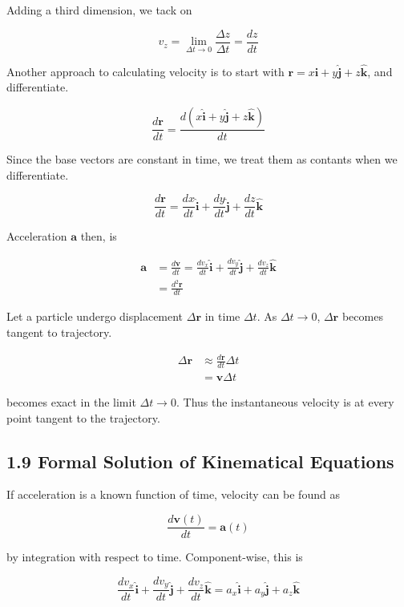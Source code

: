 \documentclass[12pt,twoside]{article}
\begin{document}
\begin{flushleft}
Adding a third dimension, we tack on

$$
  v_z = \lim_{\Delta t \rightarrow 0}\frac{\Delta z}{\Delta t} = \frac{dz}{dt}
$$


Another approach to calculating velocity is to start with $\mathbf{r} = x\mathbf{\hat{i}} + y\mathbf{\hat{j}} + z\mathbf{\hat{k}}$, and differentiate.

$$
\frac{d\mathbf{r}}{dt} = \frac{d(x\mathbf{\hat{i}} + y\mathbf{\hat{j}} + z\mathbf{\hat{k}})}{dt}
$$

Since the base vectors are constant in time, we treat them as contants when we differentiate.

$$
\frac{d\mathbf{r}}{dt} = \frac{dx}{dt}\mathbf{\hat{i}} + \frac{dy}{dt}\mathbf{\hat{j}} + \frac{dz}{dt}\mathbf{\hat{k}}
$$

Acceleration $\mathbf{a}$ then, is

\begin{align*}
  \mathbf{a} &= \frac{d\mathbf{v}}{dt} = \frac{dv_x}{dt}\mathbf{\hat{i}} + \frac{dv_y}{dt}\mathbf{\hat{j}} + \frac{dv_z}{dt}\mathbf{\hat{k}} \\
  &= \frac{d^2\mathbf{r}}{dt}
\end{align*}

Let a particle undergo displacement $\Delta \mathbf{r}$ in time $\Delta t$. As $\Delta t \rightarrow 0$, $\Delta \mathbf{r}$ becomes tangent to trajectory.

\begin{align*}
  \Delta \mathbf{r} &\approx \frac{d\mathbf{r}}{dt}\Delta t \\
                    &= \mathbf{v}\Delta t
\end{align*}

becomes exact in the limit $\Delta t \rightarrow 0$. Thus the instantaneous velocity is at every point tangent to the trajectory.

\subsection*{1.9 Formal Solution of Kinematical Equations}

If acceleration is a known function of time, velocity can be found as

$$
\frac{d\mathbf{v}(t)}{dt} = \mathbf{a}(t)
$$

by integration with respect to time. Component-wise, this is

$$
\frac{dv_x}{dt}\mathbf{\hat{i}} + \frac{dv_y}{dt}\mathbf{\hat{j}} + \frac{dv_z}{dt}\mathbf{\hat{k}} = a_x\mathbf{\hat{i}} + a_y\mathbf{\hat{j}} + a_z\mathbf{\hat{k}}
$$


\end{flushleft}
\end{document}
